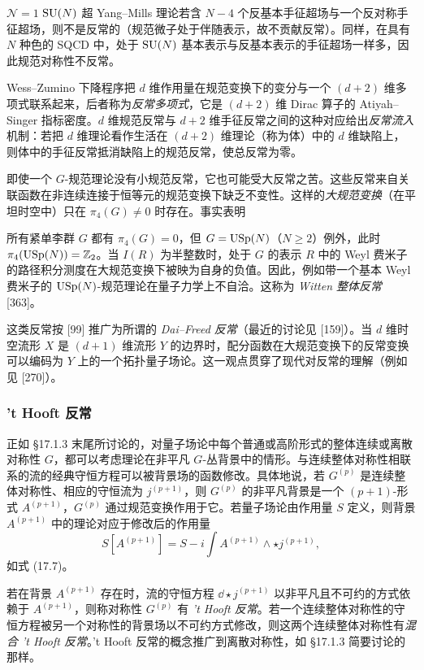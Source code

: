\begin{example}[17.37]
$\mathcal{N}=1$ $\operatorname{SU}(N)$ 超 Yang--Mills 理论若含 $N-4$ 个反基本手征超场与一个反对称手征超场，则不是反常的（规范微子处于伴随表示，故不贡献反常）。同样，在具有 $N$ 种色的 SQCD 中，处于 $\operatorname{SU}(N)$ 基本表示与反基本表示的手征超场一样多，因此规范对称性不反常。
\end{example}

Wess--Zumino 下降程序把 $d$ 维作用量在规范变换下的变分与一个 $(d+2)$ 维多项式联系起来，后者称为\emph{反常多项式}，它是 $(d+2)$ 维 Dirac 算子的 Atiyah--Singer 指标密度。$d$ 维规范反常与 $d+2$ 维手征反常之间的这种对应给出\emph{反常流入}机制：若把 $d$ 维理论看作生活在 $(d+2)$ 维理论（称为体）中的 $d$ 维缺陷上，则体中的手征反常抵消缺陷上的规范反常，使总反常为零。

即使一个 $G$-规范理论没有小规范反常，它也可能受大反常之苦。这些反常来自关联函数在非连续连接于恒等元的规范变换下缺乏不变性。这样的\emph{大规范变换}（在平坦时空中）只在 $\pi_4(G)\ne0$ 时存在。事实表明

所有紧单李群 $G$ 都有 $\pi_4(G)=0$，但 $G=\operatorname{USp}(N)$（$N\ge2$）例外，此时 $\pi_4(\operatorname{USp}(N))=\mathbb{Z}_2$。当 $I(R)$ 为半整数时，处于 $G$ 的表示 $R$ 中的 Weyl 费米子的路径积分测度在大规范变换下被映为自身的负值。因此，例如带一个基本 Weyl 费米子的 $\operatorname{USp}(N)$-规范理论在量子力学上不自洽。这称为 \emph{Witten 整体反常} [363]。

这类反常按 [99] 推广为所谓的 \emph{Dai--Freed 反常}（最近的讨论见 [159]）。当 $d$ 维时空流形 $X$ 是 $(d+1)$ 维流形 $Y$ 的边界时，配分函数在大规范变换下的反常变换可以编码为 $Y$ 上的一个拓扑量子场论。这一观点贯穿了现代对反常的理解（例如见 [270]）。

\subsubsection*{'t Hooft 反常}

正如 §17.1.3 末尾所讨论的，对量子场论中每个普通或高阶形式的整体连续或离散对称性 $G$，都可以考虑理论在非平凡 $G$-丛背景中的情形。与连续整体对称性相联系的流的经典守恒方程可以被背景场的函数修改。具体地说，若 $G^{(p)}$ 是连续整体对称性、相应的守恒流为 $j^{(p+1)}$，则 $G^{(p)}$ 的非平凡背景是一个 $(p+1)$-形式 $A^{(p+1)}$，$G^{(p)}$ 通过规范变换作用于它。若量子场论由作用量 $S$ 定义，则背景 $A^{(p+1)}$ 中的理论对应于修改后的作用量
\[
S[A^{(p+1)}]=S-i\int A^{(p+1)}\wedge\star j^{(p+1)},
\]
如式 (17.7)。

\begin{definition}[17.38]
若在背景 $A^{(p+1)}$ 存在时，流的守恒方程 $\dd\star j^{(p+1)}$ 以非平凡且不可约的方式依赖于 $A^{(p+1)}$，则称对称性 $G^{(p)}$ 有 \emph{'t Hooft 反常}。若一个连续整体对称性的守恒方程被另一个对称性的背景场以不可约方式修改，则这两个连续整体对称性有\emph{混合 't Hooft 反常}。't Hooft 反常的概念推广到离散对称性，如 §17.1.3 简要讨论的那样。
\end{definition}

